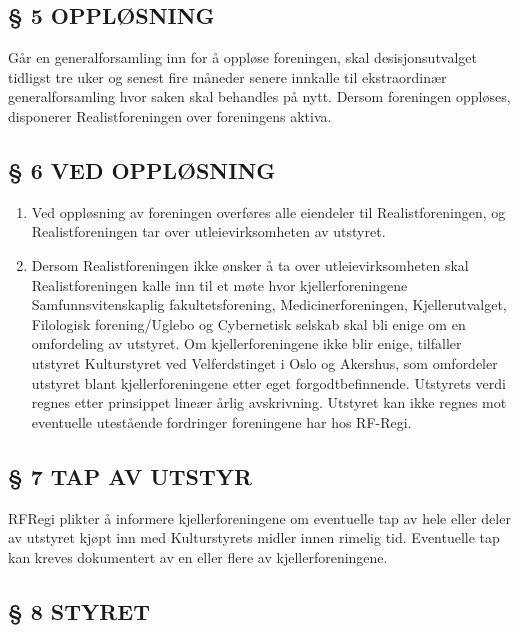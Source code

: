 \documentclass[a4paper,11pt,norsk]{scrartcl}
\begin{document}
\subsection{§ 5 OPPLØSNING%
  \label{opplosning}%
}

Går en generalforsamling inn for å oppløse foreningen, skal
desisjonsutvalget tidligst tre uker og senest fire måneder senere
innkalle til ekstraordinær generalforsamling hvor saken skal behandles
på nytt. Dersom foreningen oppløses, disponerer Realistforeningen
over foreningens aktiva.


\subsection{§ 6 VED OPPLØSNING%
  \label{ved-opplosning}%
}

\begin{enumerate}
\renewcommand{\labelenumi}{\alph{enumi})}
\item Ved oppløsning av foreningen overføres alle eiendeler til
Realistforeningen, og Realistforeningen  tar over utleievirksomheten av utstyret.

\item Dersom Realistforeningen ikke ønsker å ta over utleievirksomheten skal
Realistforeningen kalle inn til et møte hvor kjellerforeningene Samfunnsvitenskaplig
fakultetsforening, Medicinerforeningen, Kjellerutvalget, Filologisk
forening/Uglebo og Cybernetisk selskab skal
bli enige om en omfordeling av utstyret. Om kjellerforeningene ikke blir enige,
tilfaller utstyret Kulturstyret ved Velferdstinget i Oslo og Akershus, som omfordeler utstyret blant kjellerforeningene
etter eget forgodtbefinnende. Utstyrets verdi regnes etter prinsippet
lineær årlig avskrivning. Utstyret kan ikke regnes mot eventuelle
utestående fordringer foreningene har hos RF-Regi.
\end{enumerate}


\subsection{§ 7 TAP AV UTSTYR%
  \label{tap-av-utstyr}%
}

RF\-Regi plikter å informere kjellerforeningene om eventuelle tap av hele eller
deler av utstyret kjøpt inn med Kulturstyrets midler innen rimelig tid.
Eventuelle tap kan kreves dokumentert av en eller flere av kjellerforeningene.


\subsection{§ 8 STYRET%
  \label{styret}%
}
\end{document}
